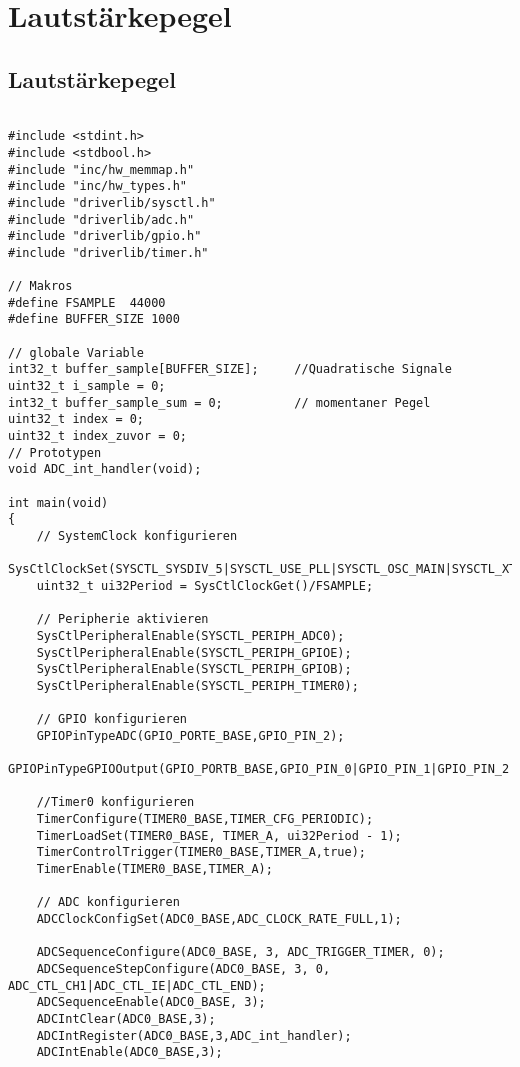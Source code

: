 \section{Lautstärkepegel}
\subsection{Lautstärkepegel}

\begin{lstlisting}

#include <stdint.h>
#include <stdbool.h>
#include "inc/hw_memmap.h"
#include "inc/hw_types.h"
#include "driverlib/sysctl.h"
#include "driverlib/adc.h"
#include "driverlib/gpio.h"
#include "driverlib/timer.h"

// Makros
#define FSAMPLE  44000
#define BUFFER_SIZE 1000

// globale Variable
int32_t buffer_sample[BUFFER_SIZE];     //Quadratische Signale
uint32_t i_sample = 0;
int32_t buffer_sample_sum = 0;          // momentaner Pegel
uint32_t index = 0;
uint32_t index_zuvor = 0;
// Prototypen
void ADC_int_handler(void);

int main(void)
{
    // SystemClock konfigurieren
    SysCtlClockSet(SYSCTL_SYSDIV_5|SYSCTL_USE_PLL|SYSCTL_OSC_MAIN|SYSCTL_XTAL_16MHZ);
    uint32_t ui32Period = SysCtlClockGet()/FSAMPLE;

    // Peripherie aktivieren
    SysCtlPeripheralEnable(SYSCTL_PERIPH_ADC0);
    SysCtlPeripheralEnable(SYSCTL_PERIPH_GPIOE);
    SysCtlPeripheralEnable(SYSCTL_PERIPH_GPIOB);
    SysCtlPeripheralEnable(SYSCTL_PERIPH_TIMER0);

    // GPIO konfigurieren
    GPIOPinTypeADC(GPIO_PORTE_BASE,GPIO_PIN_2);
    GPIOPinTypeGPIOOutput(GPIO_PORTB_BASE,GPIO_PIN_0|GPIO_PIN_1|GPIO_PIN_2|GPIO_PIN_3|GPIO_PIN_4|GPIO_PIN_5|GPIO_PIN_6|GPIO_PIN_7);

    //Timer0 konfigurieren
    TimerConfigure(TIMER0_BASE,TIMER_CFG_PERIODIC);
    TimerLoadSet(TIMER0_BASE, TIMER_A, ui32Period - 1);
    TimerControlTrigger(TIMER0_BASE,TIMER_A,true);
    TimerEnable(TIMER0_BASE,TIMER_A);

    // ADC konfigurieren
    ADCClockConfigSet(ADC0_BASE,ADC_CLOCK_RATE_FULL,1);

    ADCSequenceConfigure(ADC0_BASE, 3, ADC_TRIGGER_TIMER, 0);
    ADCSequenceStepConfigure(ADC0_BASE, 3, 0, ADC_CTL_CH1|ADC_CTL_IE|ADC_CTL_END);
    ADCSequenceEnable(ADC0_BASE, 3);
    ADCIntClear(ADC0_BASE,3);
    ADCIntRegister(ADC0_BASE,3,ADC_int_handler);
    ADCIntEnable(ADC0_BASE,3);


\end{lstlisting}
